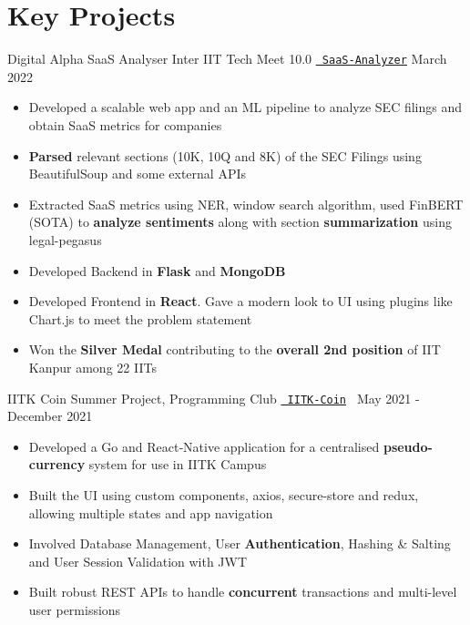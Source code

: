 \section*{\sc Key Projects}
\vspace{-2mm}
\hrulefill
\vspace{1mm}

\cventry
{Digital Alpha SaaS Analyser}
{Inter IIT Tech Meet 10.0}
{\texttt{\href{https://docs.google.com/presentation/d/1zgRrYwIt0juemg0FGrPXUjsLX2gD7f9wmv1iU7j4Gxo/edit?usp=sharing}{\faLink{} SaaS-Analyzer}}}
{March 2022}
{
\begin{itemize}
  \item Developed a scalable web app and an ML pipeline to analyze SEC filings and obtain SaaS metrics for companies
  \item \textbf{Parsed} relevant sections (10K, 10Q and 8K) of the SEC Filings using BeautifulSoup and some external APIs
  \item Extracted SaaS metrics using NER, window search algorithm, used FinBERT (SOTA) to \textbf{analyze sentiments} along with section \textbf{summarization} using legal-pegasus
  \item Developed Backend in \textbf{Flask} and \textbf{MongoDB}
  \item Developed Frontend in \textbf{React}. Gave a modern look to UI using plugins like Chart.js to meet the problem statement
  \item Won the \textbf{Silver Medal} contributing to the \textbf{overall 2nd position} of IIT Kanpur among 22 IITs
\end{itemize}
  }
\cventry
  {IITK Coin}
  {Summer Project, Programming Club}
  {\texttt{\href{https://github.com/abhishekshree/iitk-coin}{\faGithub{}}} \texttt{\href{https://github.com/abhishekshree/iitk-coin-native-app}{\faGithub{} IITK-Coin} }}
  {May 2021 - December 2021}
  {
    \begin{itemize}
      \item Developed a Go and React‑Native application for a centralised \textbf{pseudo-currency} system for use in IITK Campus
      \item Built the UI using custom components, axios, secure-store and redux, allowing multiple states and app navigation
      \item Involved Database Management, User \textbf{Authentication}, Hashing \& Salting and User Session Validation with JWT
      \item Built robust REST APIs to handle \textbf{concurrent} transactions and multi-level user permissions
    \end{itemize}
  }
